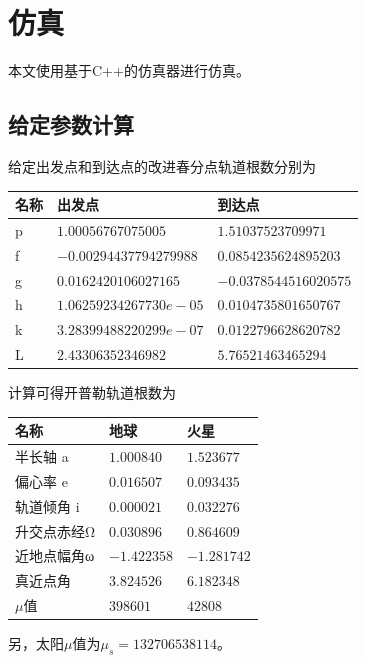 \section{仿真}
本文使用基于C++的仿真器\cite{olzhn2021}进行仿真。

\subsection{给定参数计算}
给定出发点和到达点的改进春分点轨道根数分别为
\begin{center}\begin{tabular}{lll}
    \toprule
    名称 & 出发点 & 到达点 \\
    \midrule
    p & $1.00056767075005     $ & $1.51037523709971    $ \\
    f & $-0.00294437794279988 $ & $0.0854235624895203  $ \\
    g & $0.0162420106027165   $ & $-0.0378544516020575 $ \\
    h & $1.06259234267730e-05 $ & $0.0104735801650767  $ \\
    k & $3.28399488220299e-07 $ & $0.0122796628620782  $ \\
    L & $2.43306352346982     $ & $5.76521463465294    $ \\
    \bottomrule
\end{tabular}\end{center}
计算可得开普勒轨道根数为
\begin{center}\begin{tabular}{lll}
    \toprule
    名称 & 地球 & 火星 \\
    \midrule
    半长轴    a & $ 1.000840$ & $ 1.523677$ \\
    偏心率    e & $ 0.016507$ & $ 0.093435$ \\
    轨道倾角  i & $ 0.000021$ & $ 0.032276$ \\
    升交点赤经Ω & $ 0.030896$ & $ 0.864609$ \\
    近地点幅角ω & $-1.422358$ & $-1.281742$ \\
    真近点角    & $ 3.824526$ & $ 6.182348$ \\
    $\mu$值     & $398601   $ & $42808    $ \\
    \bottomrule
\end{tabular}\end{center}
另，太阳$\mu$值为$\mu_s=132706538114$。
